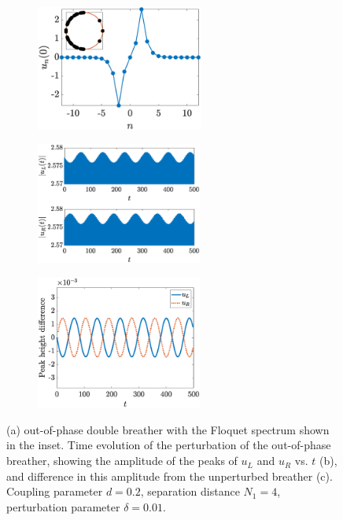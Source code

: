 \documentclass[12pt,reqno]{amsart}
\theoremstyle{definition}
\begin{document}
\begin{figure}
	\begin{center}
	\begin{subfigure}{0.3\linewidth}
		\caption{}
		\includegraphics[width=5.5cm]{timestepN6spec.eps}
		\label{fig:timestepSGstablea}
	\end{subfigure}
	\begin{subfigure}{0.3\linewidth}
		\caption{}
		\includegraphics[width=5.45cm]{timestepN6.eps}
		\label{fig:timestepSGstableb}
	\end{subfigure}
	\begin{subfigure}{0.3\linewidth}
		\caption{}
		\includegraphics[width=5.45cm]{timestepN6pks.eps}
		\label{fig:timestepSGstablec}
	\end{subfigure}
	\end{center}
	\caption{(a) out-of-phase double breather with the Floquet spectrum shown in the inset. Time evolution of the perturbation of the out-of-phase breather, showing the amplitude of the peaks of $u_L$ and $u_R$ vs. $t$ (b), and difference in this amplitude from the unperturbed breather (c).  
	Coupling parameter $d=0.2$, separation distance $N_1 = 4$, perturbation parameter $\delta = 0.01$.}
	\label{fig:timestepSGstable}
\end{figure}
\end{document}
